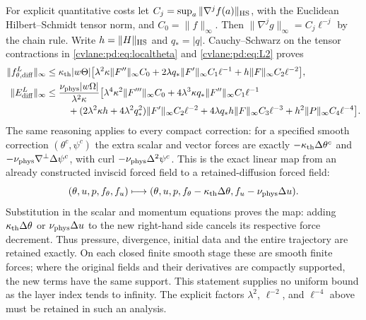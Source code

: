 For explicit quantitative costs let
$C_j=\sup_a\|\nabla^jf(a)\|_{\rm HS}$, with the Euclidean
Hilbert--Schmidt tensor norm, and $C_0=\|f\|_\infty$.
Then $\|\nabla^jg\|_\infty=C_j\ell^{-j}$ by the chain rule. Write
$h=\|H\|_{\rm HS}$ and $q_*=|q|$. Cauchy--Schwarz on the tensor
contractions in \eqref{cvlane:pd:eq:localtheta} and \eqref{cvlane:pd:eq:L2} proves
\begin{align}
 \|f^L_{\theta,\mathrm{diff}}\|_\infty
 \leq{}&\kappa_{\rm th}|w\Theta|\big[
 \lambda^2\kappa\|F''\|_\infty C_0
 +2\lambda q_*\|F'\|_\infty C_1\ell^{-1}
 +h\|F\|_\infty C_2\ell^{-2}\big],\label{cvlane:pd:eq:costtheta}\\
 \|E^L_{\mathrm{diff}}\|_\infty
 \leq{}&\frac{\nu_{\rm phys}|w\Omega|}{\lambda^2\kappa}\big[
 \lambda^4\kappa^2\|F'''\|_\infty C_0
 +4\lambda^3\kappa q_*\|F''\|_\infty C_1\ell^{-1}\notag\\
 &\quad+(2\lambda^2\kappa h+4\lambda^2q_*^2)
       \|F'\|_\infty C_2\ell^{-2}
 +4\lambda q_*h\|F\|_\infty C_3\ell^{-3}
 +h^2\|P\|_\infty C_4\ell^{-4}\big].\label{cvlane:pd:eq:costomega}
\end{align}
The same reasoning applies to every compact correction: for a specified
smooth correction $(\theta^c,\psi^c)$ the extra scalar and vector forces
are exactly $-\kappa_{\rm th}\Delta\theta^c$ and
$-\nu_{\rm phys}\nabla^\perp\Delta\psi^c$, with curl
$-\nu_{\rm phys}\Delta^2\psi^c$. This is the exact linear map from an already
constructed inviscid forced field to a retained-diffusion forced field:
\begin{equation}\label{cvlane:pd:eq:force-map}
 (\theta,u,p,f_\theta,f_u)\longmapsto
 (\theta,u,p,f_\theta-\kappa_{\rm th}\Delta\theta,
                      f_u-\nu_{\rm phys}\Delta u).
\end{equation}
Substitution in the scalar and momentum equations proves the map:
adding $\kappa_{\rm th}\Delta\theta$ or $\nu_{\rm phys}\Delta u$ to the new right-hand side
cancels its respective force decrement. Thus pressure, divergence,
initial data and the entire trajectory are retained exactly. On each
closed finite smooth stage these are smooth finite forces; where the
original fields and their derivatives are compactly supported, the new
terms have the same support. This statement supplies no uniform bound
as the layer index tends to infinity. The explicit factors
$\lambda^2$, $\ell^{-2}$, and $\ell^{-4}$ above must be retained in such
an analysis.

